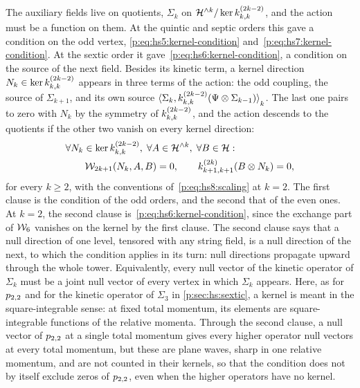The auxiliary fields live on quotients, $\Sigma_k$ on $\Hn{k} / \ker \kin{k}{}{2 k - 2}$, and the action must be a function on them.
At the quintic and septic orders this gave a condition on the odd vertex, \eqref{p:eq:hs5:kernel-condition} and~\eqref{p:eq:hs7:kernel-condition}.
At the sextic order it gave~\eqref{p:eq:hs6:kernel-condition}, a condition on the source of the next field.
Besides its kinetic term, a kernel direction $N_k \in \ker \kin{k}{}{2 k - 2}$ appears in three terms of the action: the odd coupling, the source of $\Sigma_{k + 1}$, and its own source $\pair[k]{\Sigma_k}{\kin{k}{}{2 k - 2}(\Psi \otimes \Sigma_{k - 1})}$.
The last one pairs to zero with $N_k$ by the symmetry of $\kin{k}{}{2 k - 2}$, and the action descends to the quotients if the other two vanish on every kernel direction:
\begin{equation}
  \label{p:eq:hs8:kernel-condition}
  \begin{aligned}
    &
    \forall N_k \in \ker \kin{k}{}{2 k - 2}, \;
    \forall A \in \Hn{k}, \;
    \forall B \in \Hs:
    \\ &
    \qquad
    \dvertex{2 k + 1}(N_k, A, B)
      = 0,
    \qquad
    \kin{k + 1}{}{2 k}(B \otimes N_k)
      = 0,
  \end{aligned}
\end{equation}
for every $k \ge 2$, with the conventions of~\eqref{p:eq:hs8:scaling} at $k = 2$.
The first clause is the condition of the odd orders, and the second that of the even ones.
At $k = 2$, the second clause is~\eqref{p:eq:hs6:kernel-condition}, since the exchange part of $\mathcal{W}_{6}$ vanishes on the kernel by the first clause.
The second clause says that a null direction of one level, tensored with any string field, is a null direction of the next, to which the condition applies in its turn: null directions propagate upward through the whole tower.
Equivalently, every null vector of the kinetic operator of $\Sigma_k$ must be a joint null vector of every vertex in which $\Sigma_k$ appears.
Here, as for $p_{2,2}$ and for the kinetic operator of $\Sigma_3$ in \cref{p:sec:hs:sextic}, a kernel is meant in the square-integrable sense: at fixed total momentum, its elements are square-integrable functions of the relative momenta.
Through the second clause, a null vector of $p_{2,2}$ at a single total momentum gives every higher operator null vectors at every total momentum, but these are plane waves, sharp in one relative momentum, and are not counted in their kernels, so that the condition does not by itself exclude zeros of $p_{2,2}$, even when the higher operators have no kernel.

